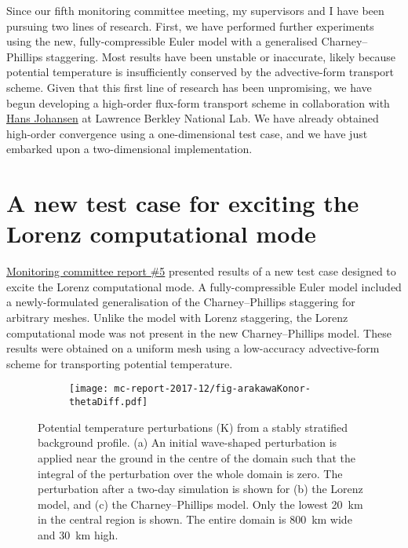 \documentclass[a4paper,11pt]{article}
\begin{document}
Since our fifth monitoring committee meeting, my supervisors and I have been pursuing two lines of research.  First, we have performed further experiments using the new, fully-compressible Euler model with a generalised Charney--Phillips staggering.  Most results have been unstable or inaccurate, likely because potential temperature is insufficiently conserved by the advective-form transport scheme.
Given that this first line of research has been unpromising, we have begun developing a high-order flux-form transport scheme in collaboration with \href{http://crd.lbl.gov/departments/applied-mathematics/ANAG/about/staff-and-postdocs/hans-johansen/}{Hans Johansen} at Lawrence Berkley National Lab.
We have already obtained high-order convergence using a one-dimensional test case, and we have just embarked upon a two-dimensional implementation.

\section{A new test case for exciting the Lorenz computational mode}

\href{http://www.datumedge.co.uk/publications/mc-report-2017-06.pdf}{Monitoring committee report \#5} presented results of a new test case designed to excite the Lorenz computational mode.
A fully-compressible Euler model included a newly-formulated generalisation of the Charney--Phillips staggering for arbitrary meshes.
Unlike the model with Lorenz staggering, the Lorenz computational mode was not present in the new Charney--Phillips model.
These results were obtained on a uniform mesh using a low-accuracy advective-form scheme for transporting potential temperature.

\begin{figure}
	\centering
	\begin{subfigure}{\textwidth}
		\label{fig:arakawaKonor:theta_diff:initial}
		\label{fig:arakawaKonor:theta_diff:lorenz}
		\label{fig:arakawaKonor:theta_diff:cp}
		\texttt{[image: mc-report-2017-12/fig-arakawaKonor-thetaDiff.pdf]}
	\end{subfigure}
	\caption{Potential temperature perturbations (\si{\kelvin}) from a stably stratified background profile.
	(a) An initial wave-shaped perturbation is applied near the ground in the centre of the domain such that the integral of the perturbation over the whole domain is zero.
	The perturbation after a two-day simulation is shown for (b) the Lorenz model, and (c) the Charney--Phillips model.
	Only the lowest \SI{20}{\kilo\meter} in the central region is shown.  The entire domain is \SI{800}{\kilo\meter} wide and \SI{30}{\kilo\meter} high.
	}
	\label{fig:arakawaKonor:theta_diff}
\end{figure}
\end{document}
